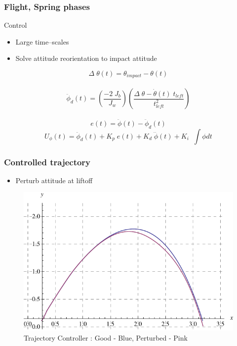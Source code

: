 \begin{frame}
\frametitle{Flight, Spring phases}
\begin{block}{Control}
\begin{itemize}
  \item
  Large time--scales\\[0.1in]
  \item
  Solve attitude reorientation to impact attitude\\[0.1in]
\end{itemize}
  \begin{equation*}
     \Delta\;\theta (t)= \theta_{impact} - \theta(t)
    \end{equation*}\\[0.1in]
    \begin{equation*}
    \ddot{\phi}_d(t) = \left(\frac{-2\;J_b}{J_w}\right) \left(\frac{\Delta\;\theta - \dot{\theta}(t)\;t_{left}}{t_{left}^2}\right)
    \end{equation*}\\[0.1in]

    \begin{equation*}
     e(t) = \ddot{\phi}(t) - \ddot{\phi}_d(t)
    \end{equation*}
    \begin{equation*}
     U_{\phi}(t) = \ddot{\phi}_d(t) + K_p\;e(t) + K_d\;\dddot{\phi}(t) + K_i\;\;\int \phi dt
    \end{equation*}
\end{block}
\end{frame}

\begin{frame}
  \frametitle{Controlled trajectory}
  \begin{itemize}
    \item
    Perturb attitude at liftoff
  \end{itemize}

  \begin{figure}
  \centering
  \includegraphics[scale=0.8]{fig/pFullTrajec_control.pdf}
  \caption{Trajectory Controller : Good - Blue, Perturbed - Pink}
  \label{fig:full_trajec_control}
  \end{figure}

\end{frame}
